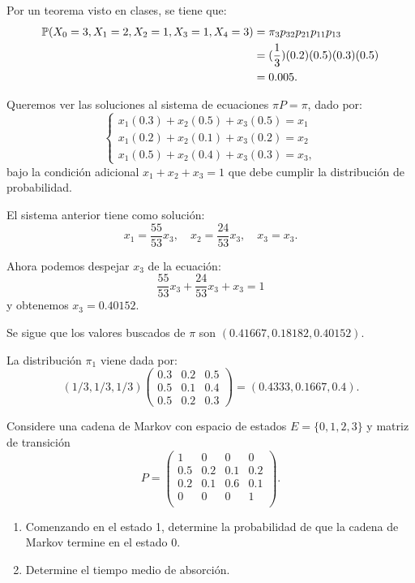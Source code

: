 \documentclass{scrartcl}
\begin{document}
\clearpage
\solution[d]
Por un teorema visto en clases, se tiene que:
\begin{align*}
	\mathbb{P}(X_0 = 3, X_1 = 2, X_2 = 1, X_3 = 1, X_4 = 3) &= \pi_3 p_{32} p_{21} p_{11} p_{13}\\
	&= (\frac13) (0.2) (0.5) (0.3) (0.5)\\
	&= 0.005.
\end{align*}

\solution[c]
Queremos ver las soluciones al sistema de ecuaciones $\pi P = \pi$, dado por:
\[
	\begin{cases}
		x_1(0.3) + x_2(0.5) + x_3(0.5) = x_1\\
		x_1(0.2) + x_2(0.1) + x_3(0.2) = x_2\\
		x_1(0.5) + x_2(0.4) + x_3(0.3) = x_3,
	\end{cases}
\]
bajo la condición adicional $x_1 + x_2 + x_3 = 1$ que debe cumplir
la distribución de probabilidad.

El sistema anterior tiene como solución:
\[
	x_1 = \frac{55}{53}x_3, \quad x_2 = \frac{24}{53}x_3, \quad x_3=x_3.	
\]

Ahora podemos despejar $x_3$ de la ecuación:
\[
	\frac{55}{53}x_3 + \frac{24}{53}x_3	+ x_3 = 1
\]
y obtenemos $x_3 = 0.40152$.

Se sigue que los valores buscados de $\pi$ son $(0.41667, 0.18182, 0.40152)$.

\clearpage
\solution[b]
La distribución $\pi_1$ viene dada por:
\[
	(1/3, 1/3, 1/3)
	\begin{pmatrix}
		0.3 & 0.2 & 0.5 \\
		0.5 & 0.1 & 0.4 \\
		0.5 & 0.2 & 0.3
	\end{pmatrix}
	= (0.4333, 0.1667, 0.4).
\]

\exercise
Considere una cadena de Markov con espacio de estados $E = \{0, 1, 2, 3\}$ y matriz
de transición
\[
	P = \begin{pmatrix}
		1 & 0 & 0 & 0 \\
		0.5 & 0.2 & 0.1 & 0.2\\
		0.2  & 0.1 & 0.6 & 0.1\\
		0 & 0 & 0 & 1 \\
		\end{pmatrix}.
\]

\begin{enumerate}[label=\alph*]
	\item Comenzando en el estado 1, determine la probabilidad de que la cadena de Markov termine en el estado 0.
	\item Determine el tiempo medio de absorción.
\end{enumerate}
\end{document}
